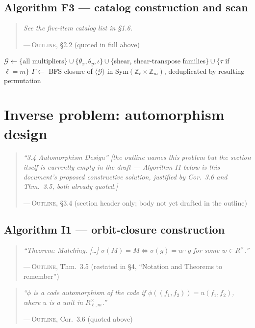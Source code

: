 \documentclass[11pt]{article}
\theoremstyle{plain}
\theoremstyle{definition}
\newenvironment{paperquote}[1]{%
  \def\paperquotecite{#1}%
  \begin{quotation}\noindent\itshape\small
}{%
  \normalfont\par\hfill---\,\textsc{Outline}, \paperquotecite\medskip
  \end{quotation}
}
\newcommand{\pq}[2]{\begin{paperquote}{#1}#2\end{paperquote}}
\begin{document}
\subsection{Algorithm F3 --- catalog construction and scan}

\pq{\S2.2 (quoted in full above)}{See the five-item catalog list in \S1.6.}

\begin{algorithm}[H]
\caption{Catalog construction (BFS closure) and full scan}
$\mathcal{G} \gets \{$all multipliers$\}\cup\{\theta_x,\theta_y,\iota\}\cup\{$shear, shear-transpose families$\}\cup\{\tau$ if $\ell=m\}$ 
$\Gamma \gets$ BFS closure of $\langle\mathcal{G}\rangle$ in $\mathrm{Sym}(\mathbb{Z}_\ell\times\mathbb{Z}_m)$, deduplicated by resulting permutation\;
\end{algorithm}

\section{Inverse problem: automorphism design}
\label{sec:inverse}

\pq{\S3.4 (section header only; body not yet drafted in the outline)}{%
``3.4 Automorphism Design'' [the outline names this problem but the section
itself is currently empty in the draft --- Algorithm I1 below is this
document's proposed constructive solution, justified by Cor.\ 3.6 and Thm.\
3.5, both already quoted.]
}

\subsection{Algorithm I1 --- orbit-closure construction}

\pq{Thm.\ 3.5 (restated in \S4, ``Notation and Theorems to remember'')}{%
``Theorem: Matching. [\ldots] $\sigma(M)=M \iff \sigma(g)=w\cdot g$ for some
$w\in R^\times$.''
}

\pq{Cor.\ 3.6 (quoted above)}{%
``$\phi$ is a code automorphism of the code if $\phi((f_1,f_2))=u(f_1,f_2)$,
where $u$ is a unit in $R_{\ell,m}^\times$.''
}
\end{document}
